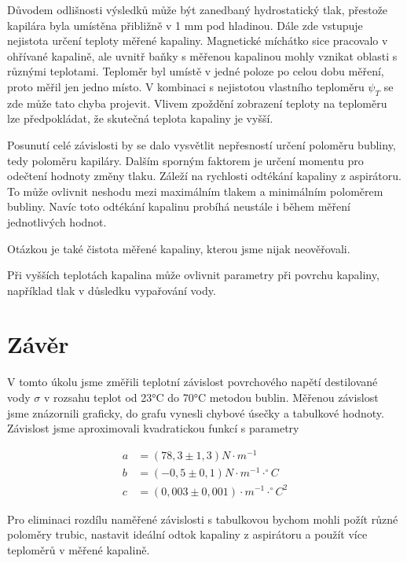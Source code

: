 Důvodem odlišnosti výsledků může být zanedbaný hydrostatický tlak, přestože kapilára byla umístěna přibližně v 1 mm pod hladinou. Dále zde vstupuje nejistota určení teploty měřené kapaliny. Magnetické míchátko sice pracovalo v ohřívané kapalině, ale uvnitř baňky s měřenou kapalinou mohly vznikat oblasti s různými teplotami. Teploměr byl umístě v jedné poloze po celou dobu měření, proto měřil jen jedno místo. V kombinaci s nejistotou vlastního teploměru $\psi_T$ se zde může tato chyba projevit. Vlivem zpoždění zobrazení teploty na teploměru lze předpokládat, že skutečná teplota kapaliny je vyšší.

Posunutí celé závislosti by se dalo vysvětlit nepřesností určení poloměru bubliny, tedy poloměru kapiláry. Dalším sporným faktorem je určení momentu pro odečtení hodnoty změny tlaku. Záleží na rychlosti odtékání kapaliny z aspirátoru. To může ovlivnit neshodu mezi maximálním tlakem a minimálním poloměrem bubliny. Navíc toto odtékání kapalinu probíhá neustále i během měření jednotlivých hodnot.

Otázkou je také čistota měřené kapaliny, kterou jsme nijak neověřovali.

Při vyšších teplotách kapalina může ovlivnit parametry při povrchu kapaliny, například tlak v důsledku vypařování vody.

\section{Závěr}

V tomto úkolu jsme změřili teplotní závislost povrchového napětí destilované vody $\sigma$ v rozsahu teplot od 23°C do 70°C metodou bublin. Měřenou závislost jsme znázornili graficky, do grafu vynesli chybové úsečky a tabulkové hodnoty. Závislost jsme aproximovali kvadratickou funkcí s parametry

\begin{align*}
    a &= (78,3 \pm 1,3) N \cdot m^{-1}\\
    b &= (-0,5 \pm 0,1) N \cdot m^{-1} \cdot ^\circ C\\
    c &= (0,003 \pm 0,001) \cdot m^{-1} \cdot ^\circ C^2
\end{align*}

Pro eliminaci rozdílu naměřené závislosti s tabulkovou bychom mohli požít různé poloměry trubic, nastavit ideální odtok kapaliny z aspirátoru a použít více teploměrů v měřené kapalině.